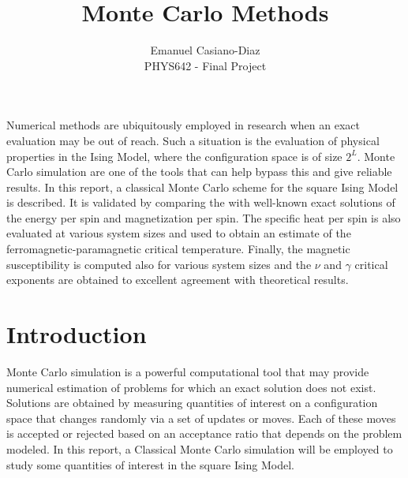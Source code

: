 \documentclass[12pt]{article}
\begin{document}
 
 
\title{Monte Carlo Methods}%
\author{Emanuel Casiano-Diaz\\ %
PHYS642 - Final Project } %
 
\maketitle

Numerical methods are ubiquitously employed in research when an exact evaluation may be out of reach. Such a situation is the evaluation of physical properties in the Ising Model, where the configuration space is of size $2^L$. Monte Carlo simulation are one of the tools that can help bypass this and give reliable results. In this report, a classical Monte Carlo scheme for the square Ising Model is described. It is validated by comparing the with well-known exact solutions of the energy per spin and magnetization per spin. The specific heat per spin is also evaluated at various system sizes and used to obtain an estimate of the ferromagnetic-paramagnetic critical temperature. Finally, the magnetic susceptibility is computed also for various system sizes and the $\nu$ and $\gamma$ critical exponents are obtained to excellent agreement with theoretical results.

\section{Introduction}

Monte Carlo simulation is a powerful computational tool that may provide numerical estimation of problems for which an exact solution does not exist. Solutions are obtained by measuring quantities of interest on a configuration space that changes randomly via a set of updates or moves. Each of these moves is accepted or rejected based on an acceptance ratio that depends on the problem modeled. In this report, a Classical Monte Carlo simulation will be employed to study some quantities of interest in the square Ising Model.
\end{document}

